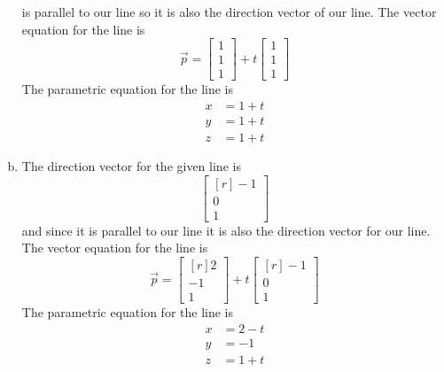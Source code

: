 \documentclass[../main.tex]{subfiles}
\begin{document}
\begin{enumerate}[a)]
		is parallel to our line so it is also the direction vector of our line.
		The vector equation for the line is
		\[ \vec{p} = \begin{bmatrix}
					1\\
					1\\
					1
			     \end{bmatrix}
			     + t \begin{bmatrix}
			     1\\
			     1\\
			     1
			     \end{bmatrix} \]
		The parametric equation for the line is
			   \begin{align*}
			   	x &= 1+t\\
				y &= 1+t\\
				z &= 1+t
			   \end{align*}
	\setcounter{enumi}{5}
	\item The direction vector for the given line is
		\[ \begin{bmatrix*}[r]-1\\0\\1\end{bmatrix*} \]
		and since it is parallel to our line it is also the direction vector for our line.
		The vector equation for the line is
		\[ \vec{p} = \begin{bmatrix*}[r]
					2\\
					-1\\
					1
			     \end{bmatrix*}
				 + t \begin{bmatrix*}[r]
			     -1\\
			     0\\
			     1
			     \end{bmatrix*} \]
		The parametric equation for the line is
			   \begin{align*}
			   	x &= 2-t\\
				y &= -1\\
				z &= 1+t
			   \end{align*}
\end{enumerate}
\end{document}
